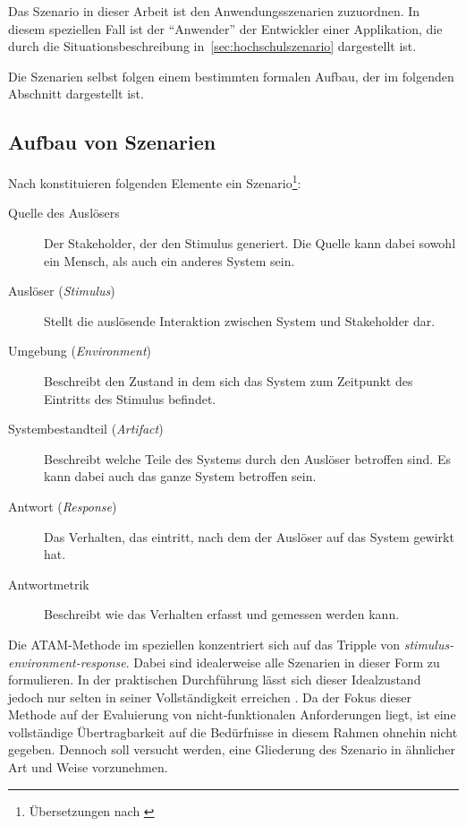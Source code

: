   Das Szenario in dieser Arbeit ist den Anwendungsszenarien zuzuordnen. In diesem speziellen Fall ist der "`Anwender"' der Entwickler einer Applikation, die durch die Situationsbeschreibung in~\ref{sec:hochschulszenario} dargestellt ist.
  
  Die Szenarien selbst folgen einem bestimmten formalen Aufbau, der im folgenden Abschnitt dargestellt ist.


\subsection{Aufbau von Szenarien} %
\label{sub:aufbau_von_szenarien}

  Nach \citep[S. 75]{software_architecture_in_practice} konstituieren folgenden Elemente ein Szenario\footnote{Übersetzungen nach \citep[S. 63]{effektive_software_architekturen}}:
  
  \begin{description}
    \item[Quelle des Auslösers] Der Stakeholder, der den Stimulus generiert. Die Quelle kann dabei sowohl ein Mensch, als auch ein anderes System sein.
    \item[Auslöser (\emph{Stimulus})] Stellt die auslösende Interaktion zwischen System und Stakeholder dar.
    \item[Umgebung (\emph{Environment})] Beschreibt den Zustand in dem sich das System zum Zeitpunkt des Eintritts des Stimulus befindet.
    \item[Systembestandteil (\emph{Artifact})] Beschreibt welche Teile des Systems durch den Auslöser betroffen sind. Es kann dabei auch das ganze System betroffen sein.
    \item[Antwort (\emph{Response})] Das Verhalten, das eintritt, nach dem der Auslöser auf das System gewirkt hat.
    \item[Antwortmetrik] Beschreibt wie das Verhalten erfasst und gemessen werden kann.
  \end{description}
  
  Die ATAM-Methode im speziellen konzentriert sich auf das Tripple von \emph{stimulus-environ\-ment-response}. Dabei sind idealerweise alle Szenarien in dieser Form zu formulieren. In der praktischen Durchführung lässt sich dieser Idealzustand jedoch nur selten in seiner Vollständigkeit erreichen \citep[S. 53]{evaluating_software_architectures}. Da der Fokus dieser Methode auf der Evaluierung von nicht-funktionalen Anforderungen liegt, ist eine vollständige Übertragbarkeit auf die Bedürfnisse in diesem Rahmen ohnehin nicht gegeben. Dennoch soll versucht werden, eine Gliederung des Szenario in ähnlicher Art und Weise vorzunehmen.

